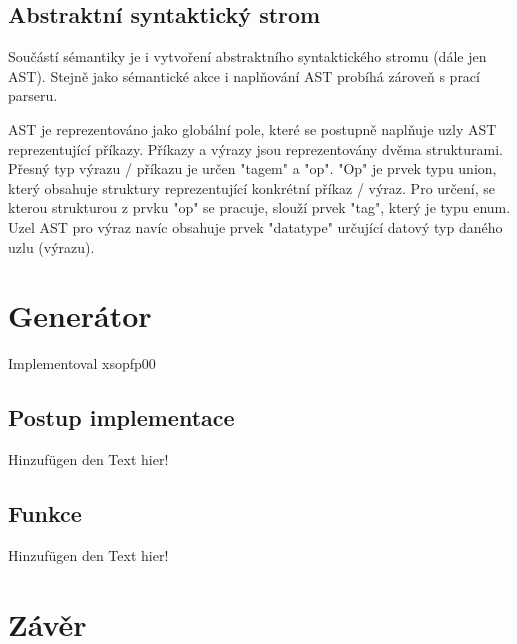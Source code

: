 \documentclass[11pt,a4paper]{article}
\begin{document}
    \subsection{Abstraktní syntaktický strom}
    Součástí sémantiky je i vytvoření abstraktního syntaktického stromu (dále jen AST). Stejně jako sémantické akce i naplňování AST probíhá zároveň s prací parseru.

    AST je reprezentováno jako globální pole, které se postupně naplňuje uzly AST reprezentující příkazy. Příkazy a výrazy jsou reprezentovány dvěma strukturami. Přesný typ výrazu / příkazu je určen "tagem" a "op". "Op" je prvek typu union, který obsahuje struktury reprezentující konkrétní příkaz / výraz. Pro určení, se kterou strukturou z prvku "op" se pracuje, slouží prvek "tag", který je typu enum. Uzel AST pro výraz navíc obsahuje prvek "datatype" určující datový typ daného uzlu (výrazu). \cite{AST:AST_in_C}

	\newpage


\section{Generátor}
    Implementoval xsopfp00

    \subsection{Postup implementace}
    \noindent Hinzufügen den Text hier!

    \subsection{Funkce}
    \noindent Hinzufügen den Text hier!

    \newpage
    


\section{Závěr}
\end{document}
